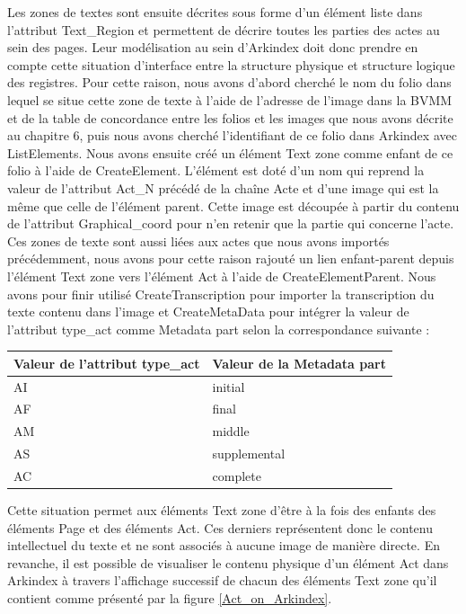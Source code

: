 \documentclass[a4paper,12pt,twoside]{book}
\begin{document}
	Les zones de textes sont ensuite décrites sous forme d'un élément liste dans l'attribut \og Text\_Region\fg{} et permettent de décrire toutes les parties des actes au sein des pages. Leur modélisation au sein d'Arkindex doit donc prendre en compte cette situation d'interface entre la structure physique et structure logique des registres. Pour cette raison, nous avons d'abord cherché le nom du folio dans lequel se situe cette zone de texte à l'aide de l'adresse de l'image dans la BVMM et de la table de concordance entre les folios et les images que nous avons décrite au chapitre 6, puis nous avons cherché l'identifiant de ce folio dans Arkindex avec ListElements. Nous avons ensuite créé un élément Text zone comme enfant de ce folio à l'aide de CreateElement. L'élément est doté d'un nom qui reprend la valeur de l'attribut \og Act\_N\fg{} précédé de la chaîne \og Acte\fg{} et d'une image qui est la même que celle de l'élément parent. Cette image est découpée à partir du contenu de l'attribut \og Graphical\_coord\fg{} pour n'en retenir que la partie qui concerne l'acte. Ces zones de texte sont aussi liées aux actes que nous avons importés précédemment, nous avons pour cette raison rajouté un lien enfant-parent depuis l'élément Text zone vers l'élément Act à l'aide de CreateElementParent. Nous avons pour finir utilisé CreateTranscription pour importer la transcription du texte contenu dans l'image et CreateMetaData pour intégrer la valeur de l'attribut \og type\_act{} comme Metadata \og part\fg{} selon la correspondance suivante :
	
	\begin{center}
		\begin{tabular}{|p{4cm}|p{4cm}|}
			\hline
			Valeur de l'attribut \og type\_act\fg{} & Valeur de la Metadata \og part\fg{}\\
			\hline\hline
			AI & initial \\ \hline
			AF & final \\ \hline
			AM & middle \\ \hline
			AS & supplemental \\ \hline
			AC & complete \\ \hline
		\end{tabular}
	\end{center}
	
	Cette situation permet aux éléments \og Text zone\fg{} d'être à la fois des enfants des éléments \og Page\fg{} et des éléments \og Act\fg{}. Ces derniers représentent donc le contenu intellectuel du texte et ne sont associés à aucune image de manière directe. En revanche, il est possible de visualiser le contenu physique d'un élément \og Act\fg{} dans Arkindex à travers l'affichage successif de chacun des éléments \og Text zone\fg{} qu'il contient comme présenté par la figure \ref{Act_on_Arkindex}.
	
\end{document}
